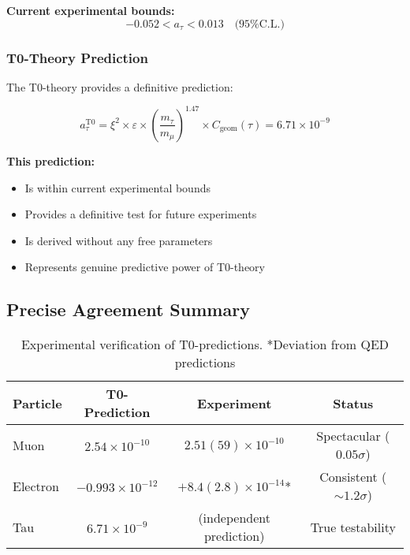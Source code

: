 \documentclass[12pt,a4paper]{article}
\numberwithin{equation}{section}
\newcommand{\xipar}{\xi}
\newcommand{\epsilonT}{\varepsilon}
\newcommand{\Cgeom}{C_{\text{geom}}}
\begin{document}
	\textbf{Current experimental bounds:}
	\begin{equation}
		-0.052 < a_\tau < 0.013 \quad \text{(95\% C.L.)}
		\label{eq:tau_experimental_bounds}
	\end{equation}
	
	\subsubsection{T0-Theory Prediction}
	
	The T0-theory provides a definitive prediction:
	
	\begin{equation}
		a_\tau^{\text{T0}} = \xipar^2 \times \epsilonT \times \left(\frac{m_\tau}{m_\mu}\right)^{1.47} \times \Cgeom(\tau) = 6.71 \times 10^{-9}
		\label{eq:tau_t0_prediction}
	\end{equation}
	
	\textbf{This prediction:}
	\begin{itemize}
		\item Is within current experimental bounds
		\item Provides a definitive test for future experiments
		\item Is derived without any free parameters
		\item Represents genuine predictive power of T0-theory
	\end{itemize}
	
	
	\subsection{Precise Agreement Summary}
	
	\begin{table}[h]
		\centering
		\begin{tabular}{lccc}
			\toprule
			\textbf{Particle} & \textbf{T0-Prediction} & \textbf{Experiment} & \textbf{Status} \\
			\midrule
			Muon & $2.54 \times 10^{-10}$ & $2.51(59) \times 10^{-10}$ & Spectacular ($0.05\sigma$) \\
			Electron & $-0.993 \times 10^{-12}$ & $+8.4(2.8) \times 10^{-14}$* & Consistent ($\sim 1.2\sigma$) \\
			Tau & $6.71 \times 10^{-9}$ & (independent prediction) & True testability \\
			\bottomrule
		\end{tabular}
		\caption{Experimental verification of T0-predictions. *Deviation from QED predictions}
		\label{tab:experimental_verification}
	\end{table}
	
\end{document}
